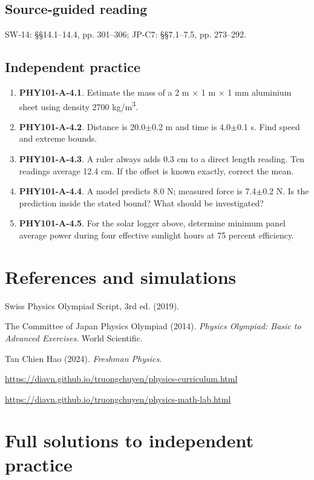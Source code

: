 \documentclass[11pt,a4paper,openany]{book}
\begin{document}
\section{Source-guided reading}
SW-14: §§14.1–14.4, pp. 301–306; JP-C7: §§7.1–7.5, pp. 273–292.
\section{Independent practice}
\begin{enumerate}
\item \textbf{PHY101-A-4.1}. Estimate the mass of a 2 m \ensuremath{\times} 1 m \ensuremath{\times} 1 mm aluminium sheet using density 2700 kg/m\textsuperscript{3}.
\item \textbf{PHY101-A-4.2}. Distance is 20.0\ensuremath{\pm}0.2 m and time is 4.0\ensuremath{\pm}0.1 s. Find speed and extreme bounds.
\item \textbf{PHY101-A-4.3}. A ruler always adds 0.3 cm to a direct length reading. Ten readings average 12.4 cm. If the offset is known exactly, correct the mean.
\item \textbf{PHY101-A-4.4}. A model predicts 8.0 N; measured force is 7.4\ensuremath{\pm}0.2 N. Is the prediction inside the stated bound? What should be investigated?
\item \textbf{PHY101-A-4.5}. For the solar logger above, determine minimum panel average power during four effective sunlight hours at 75 percent efficiency.
\end{enumerate}
\chapter*{References and simulations}
Swiss Physics Olympiad Script, 3rd ed. (2019).\par
The Committee of Japan Physics Olympiad (2014). \textit{Physics Olympiad: Basic to Advanced Exercises}. World Scientific.\par
Tan Chien Hao (2024). \textit{Freshman Physics}.\par
\url{https://diavn.github.io/truongchuyen/physics-curriculum.html}\par
\url{https://diavn.github.io/truongchuyen/physics-math-lab.html}
\appendix
\chapter{Full solutions to independent practice}
\end{document}
